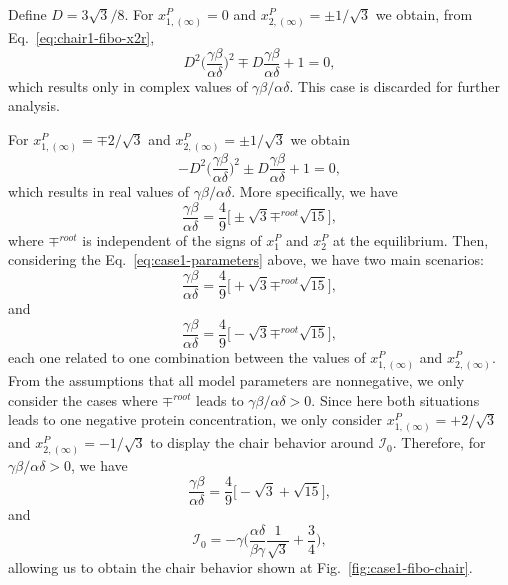 Define $D = 3\sqrt{3}/8$. For $x_{1,(\infty)}^P = 0$ and $x_{2,(\infty)}^P = \pm 1/\sqrt{3}$ we obtain,
 from Eq.~\ref{eq:chair1-fibo-x2r}, 
\begin{equation}
    D^2\bigg(\frac{\gamma\beta}{\alpha\delta}\bigg)^2 \mp D\frac{\gamma\beta}{\alpha\delta} + 1 = 0,
\end{equation}
which results only in complex values of $\gamma\beta/\alpha\delta$. This case is discarded for further analysis.

For $x_{1,(\infty)}^P = \mp 2/\sqrt{3}$ and $x_{2,(\infty)}^P = \pm 1/\sqrt{3}$ we obtain
\begin{equation}
    -D^2\bigg(\frac{\gamma\beta}{\alpha\delta}\bigg)^2 \pm D\frac{\gamma\beta}{\alpha\delta} + 1 = 0,
\end{equation}
which results in real values of $\gamma\beta/\alpha\delta$. More specifically, we have 
\begin{equation} \label{eq:case1-parameters}
    \frac{\gamma\beta}{\alpha\delta} = \frac{4}{9}\bigg[ \pm \sqrt{3} \mp^{root} \sqrt{15} \bigg],
\end{equation}
where $\mp^{root}$ is independent of the signs of $x_1^P$ and $x_2^P$ at the equilibrium. Then,
considering the Eq.~\ref{eq:case1-parameters} above, we have two main scenarios:
\begin{equation}
    \frac{\gamma\beta}{\alpha\delta} = \frac{4}{9}\bigg[ + \sqrt{3} \mp^{root} \sqrt{15} \bigg],
\end{equation} 
and 
\begin{equation}
    \frac{\gamma\beta}{\alpha\delta} = \frac{4}{9}\bigg[ - \sqrt{3} \mp^{root} \sqrt{15} \bigg],
\end{equation}
each one related to one combination between the values of $x_{1,(\infty)}^P$ and $x_{2,(\infty)}^P$.
From the assumptions that all model parameters are nonnegative, we only consider the cases where $\mp^{root}$
leads to $\gamma\beta/\alpha\delta > 0$. Since here both situations leads to one negative protein 
concentration, we only consider $x_{1,(\infty)}^P = + 2/\sqrt{3}$ and $x_{2,(\infty)}^P = - 1/\sqrt{3}$
to display the chair behavior around $\mathcal{I}_0$. Therefore, for $\gamma\beta/\alpha\delta > 0$,
we have 
\begin{equation}
    \frac{\gamma\beta}{\alpha\delta} = \frac{4}{9}\bigg[ - \sqrt{3} + \sqrt{15} \bigg],
\end{equation}
and 
\begin{equation}
    \mathcal{I}_0 = -\gamma \bigg(\frac{\alpha\delta}{\beta\gamma}\frac{1}{\sqrt{3}} + \frac{3}{4}\bigg),
\end{equation}
allowing us to obtain the chair behavior shown at Fig.~\ref{fig:case1-fibo-chair}.

